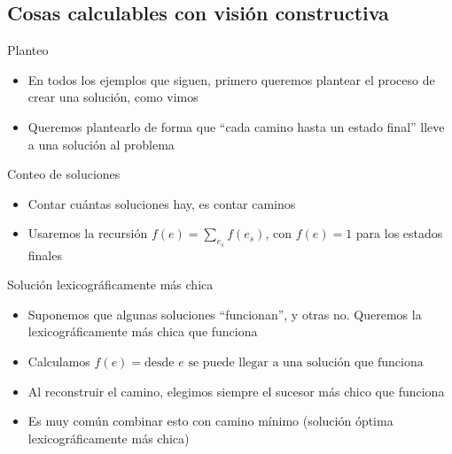 \documentclass{beamer}
\begin{document}
\subsection{Cosas calculables con visión constructiva}

\begin{frame}{Planteo}
	\begin{itemize}
		\item En todos los ejemplos que siguen, primero queremos plantear el proceso de crear una solución, como vimos
		\item Queremos plantearlo de forma que ``cada camino hasta un estado final'' lleve a una solución al problema
	\end{itemize}
\end{frame}

\begin{frame}{Conteo de soluciones}
	\begin{itemize}
		\item Contar cuántas soluciones hay, es contar caminos
		\item Usaremos la recursión $f(e) = \sum_{e_s}{f(e_s)}$, con $f(e) = 1$ para los estados finales
	\end{itemize}
\end{frame}

\begin{frame}{Solución lexicográficamente más chica}
	\begin{itemize}
		\item Suponemos que algunas soluciones ``funcionan'', y otras no. Queremos la lexicográficamente más chica que funciona
		\item Calculamos $f(e) = \mbox{desde $e$ se puede llegar a una solución que funciona}$
		\item Al reconstruir el camino, elegimos siempre el sucesor más chico que funciona
		\item Es muy común combinar esto con camino mínimo (solución óptima lexicográficamente más chica)
	\end{itemize}
\end{frame}
\end{document}
